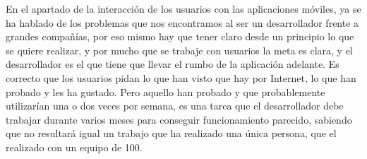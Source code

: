 En el apartado de la interacción de los usuarios con las aplicaciones móviles, ya se ha hablado de los problemas que nos encontramos al ser un desarrollador frente a grandes compañías, por eso mismo hay que tener claro desde un principio lo que se quiere realizar, y por mucho que se trabaje con usuarios la meta es clara, y el desarrollador es el que tiene que llevar el rumbo de la aplicación adelante. Es correcto que los usuarios pidan lo que han visto que hay por Internet, lo que han probado y les ha gustado. Pero aquello han probado y que probablemente utilizarían una o dos veces por semana, es una tarea que el desarrollador debe trabajar durante varios meses para conseguir funcionamiento parecido, sabiendo que no resultará igual un trabajo que ha realizado una única persona, que el realizado con un equipo de 100.






















